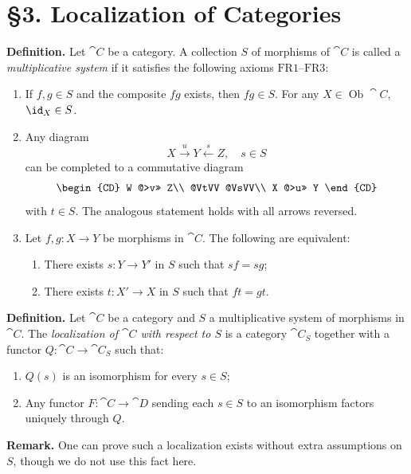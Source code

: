 \setcounter{page}{28}
\section{\S3. Localization of Categories}

\textbf{Definition.}
Let \(\cat{C}\) be a category. A collection \(S\) of morphisms of \(\cat{C}\) is called a \textit{multiplicative system} if it satisfies the following axioms \(\text{FR1}\)--\(\text{FR3}\):

\begin{enumerate}
\item[(FR1)] If \(f,g\in S\) and the composite \(fg\) exists, then \(fg\in S\). For any \(X\in\operatorname{Ob}\cat{C}\), \(\id_X\in S\).

\item[(FR2)] Any diagram
\[
X\xrightarrow{u} Y \xleftarrow{s} Z,\quad s\in S
\]
can be completed to a commutative diagram
\[
\begin{CD}
W @>v>> Z\\
@VtVV @VsVV\\
X @>u>> Y
\end{CD}
\]
with \(t\in S\). The analogous statement holds with all arrows reversed.

\item[(FR3)] Let \(f,g\colon X\to Y\) be morphisms in \(\cat{C}\). The following are equivalent:
\begin{enumerate}
\item[(i)] There exists \(s\colon Y\to Y'\) in \(S\) such that \(sf = sg\);
\item[(ii)] There exists \(t\colon X'\to X\) in \(S\) such that \(ft = gt\).
\end{enumerate}
\end{enumerate}

\setcounter{page}{29}
\textbf{Definition.}
Let \(\cat{C}\) be a category and \(S\) a multiplicative system of morphisms in \(\cat{C}\). The \textit{localization of \(\cat{C}\) with respect to \(S\)} is a category \(\cat{C}_S\) together with a functor \(Q\colon\cat{C}\to\cat{C}_S\) such that:
\begin{enumerate}
\item[(a)] \(Q(s)\) is an isomorphism for every \(s\in S\);
\item[(b)] Any functor \(F\colon\cat{C}\to\cat{D}\) sending each \(s\in S\) to an isomorphism factors uniquely through \(Q\).
\end{enumerate}

\textbf{Remark.} One can prove such a localization exists without extra assumptions on \(S\), though we do not use this fact here.

